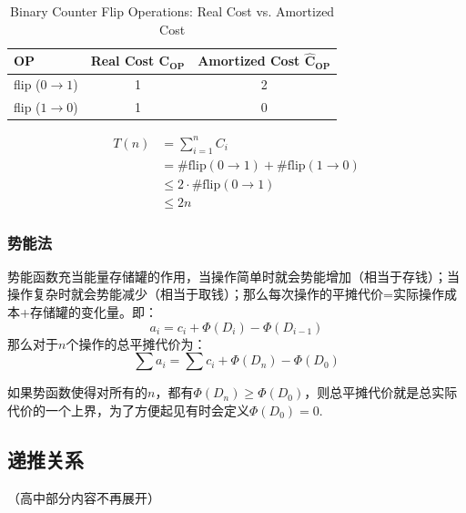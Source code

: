 \documentclass[./../main.tex]{subfiles} %
\begin{document}
\begin{table}[h]
\centering
\caption{Binary Counter Flip Operations: Real Cost vs. Amortized Cost}
\begin{tabular}{lcc}
\toprule
\textbf{OP} & \textbf{Real Cost }$\boldsymbol{C_{OP}}$ & \textbf{Amortized Cost }$\boldsymbol{\widehat{C}_{OP}}$ \\
\midrule
flip ($0 \to 1$) & 1 & 2 \\
flip ($1 \to 0$) & 1 & 0 \\
\bottomrule
\end{tabular}
\end{table}

\begin{align*}
T(n) &= \sum_{i=1}^{n} C_i \\
     &= \#\mathrm{flip}(0 \rightarrow 1) + \#\mathrm{flip}(1 \rightarrow 0) \\
     &\leq 2 \cdot \#\mathrm{flip}(0 \rightarrow 1) \\
     &\leq 2n
\end{align*}


\subsubsection{势能法}
势能函数充当能量存储罐的作用，当操作简单时就会势能增加（相当于存钱）；当操作复杂时就会势能减少（相当于取钱）；那么每次操作的平摊代价=实际操作成本+存储罐的变化量。即：
$$
a_i=c_i+\Phi(D_i)-\Phi(D_{i-1})
$$
那么对于$n$个操作的总平摊代价为：
$$
\sum a_i=\sum c_i+\Phi(D_n)-\Phi(D_0)
$$

如果势函数使得对所有的$n$，都有$\Phi(D_n)\ge\Phi(D_0)$，则总平摊代价就是总实际代价的一个上界，为了方便起见有时会定义$\Phi(D_0)=0$.

\subsection{递推关系}
（高中部分内容不再展开）
\end{document}
